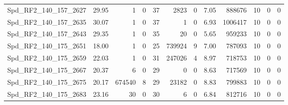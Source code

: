 \begin{longtable}[c]{@{}lrrrrrrrrrrr@{}}
Spd\_RF2\_140\_157\_2627      & 29.95                  & 1                       & 0                       & 37                     & 2823                    & 0                       & 7.05                    & 888676                   & 10                       & 0                        & 0                        \\
Spd\_RF2\_140\_157\_2635      & 30.07                  & 1                       & 0                       & 37                     & 1                       & 0                       & 6.93                    & 1006417                  & 10                       & 0                        & 0                        \\
Spd\_RF2\_140\_157\_2643      & 29.35                  & 1                       & 0                       & 35                     & 20                      & 0                       & 5.65                    & 959233                   & 10                       & 0                        & 0                        \\
Spd\_RF2\_140\_175\_2651      & 18.00                  & 1                       & 0                       & 25                     & 739924                  & 9                       & 7.00                    & 787093                   & 10                       & 0                        & 0                        \\
Spd\_RF2\_140\_175\_2659      & 22.03                  & 1                       & 0                       & 31                     & 247026                  & 4                       & 8.97                    & 718753                   & 10                       & 0                        & 0                        \\
Spd\_RF2\_140\_175\_2667      & 20.37                  & 6                       & 0                       & 29                     & 0                       & 0                       & 8.63                    & 717569                   & 10                       & 0                        & 0                        \\
Spd\_RF2\_140\_175\_2675      & 20.17                  & 674540                  & 8                       & 29                     & 23182                   & 0                       & 8.83                    & 799883                   & 10                       & 0                        & 0                        \\
Spd\_RF2\_140\_175\_2683      & 23.16                  & 30                      & 0                       & 30                     & 6                       & 0                       & 6.84                    & 812716                   & 10                       & 0                        & 0                        \\

\end{longtable}
